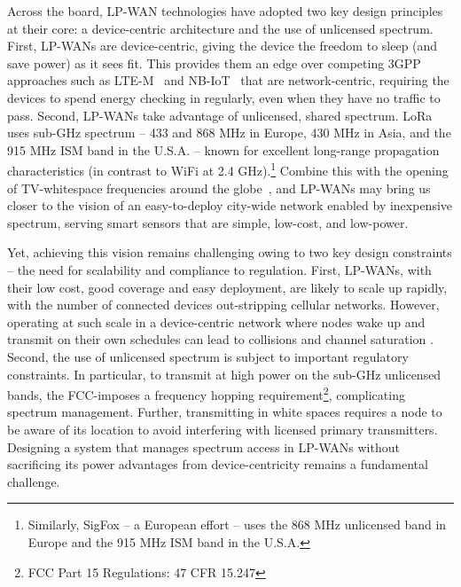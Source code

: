 Across the board, LP-WAN technologies have adopted two key design principles at their core: a device-centric architecture and the use of unlicensed spectrum. First, LP-WANs are device-centric, giving the device the freedom to sleep (and save power) as it sees fit. This provides them an edge over competing 3GPP approaches such as LTE-M~\cite{GSMAssociation2016} and NB-IoT~\cite{Ratasuk2016} that are network-centric, requiring the devices to spend energy checking in regularly, even when they have no traffic to pass. Second, LP-WANs take advantage of  unlicensed, shared spectrum.  LoRa uses sub-GHz spectrum -- 433 and 868 MHz in Europe, 430 MHz in Asia, and the 915 MHz ISM band in the U.S.A. -- known for excellent long-range propagation characteristics (in contrast to WiFi at 2.4 GHz).\footnote{Similarly, SigFox -- a European effort -- uses the 868 MHz unlicensed band in Europe and the 915 MHz ISM band in the U.S.A.} Combine this with  the opening of TV-whitespace frequencies around the globe~\cite{FCC_Whitespaces}, and LP-WANs may bring us closer to the vision of an easy-to-deploy city-wide network enabled by inexpensive spectrum, serving smart sensors that are simple, low-cost, and low-power. 




Yet, achieving this vision remains challenging owing to two key design constraints -- the need for scalability and compliance to regulation. First, LP-WANs, with their low cost, good coverage and easy deployment, are likely to scale up rapidly, with the number of connected devices out-stripping cellular networks. However, operating at such scale in a device-centric network where nodes wake up and transmit on their own schedules can lead to collisions and channel saturation \cite{Abramson1970}. Second, the use of unlicensed spectrum is subject to important regulatory constraints. In particular, to transmit at high power on the sub-GHz unlicensed bands, the FCC-imposes a frequency hopping requirement\footnote{FCC Part 15 Regulations: 47 CFR 15.247}, complicating spectrum management. Further, transmitting in white spaces requires a node to be aware of its location to avoid interfering with licensed primary transmitters. Designing a system that manages spectrum access in LP-WANs without sacrificing its power advantages from device-centricity remains a fundamental challenge. 


